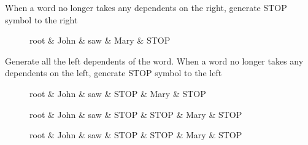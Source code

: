 \documentclass{beamer}
\begin{document}
\begin{frame}
When a word no longer takes any dependents on the right, generate STOP symbol to the right
\begin{figure}
\centering
\begin{dependency}[theme = simple]
\begin{deptext}
root \& John \& saw \& Mary \& STOP \\
\end{deptext}
\end{dependency}
\end{figure}
\end{frame}

\begin{frame}
Generate all the left dependents of the word. When a word no longer takes any dependents on the left, generate STOP symbol to the left

\begin{figure}
\centering
\begin{dependency}[theme = simple]
\begin{deptext}
root \& John \& saw \& STOP \& Mary \& STOP \\
\end{deptext}
\end{dependency}
\end{figure}
\end{frame}

\begin{frame}
\begin{figure}
\centering
\begin{dependency}[theme = simple]
\begin{deptext}
root \& John \& saw \& STOP \& STOP \& Mary \& STOP \\
\end{deptext}
\end{dependency}
\end{figure}
\end{frame}


\begin{frame}
\begin{figure}
\centering
\begin{dependency}[theme = simple]
\begin{deptext}
root \& John \& saw \& STOP \& STOP \& Mary \& STOP \\
\end{deptext}
\end{dependency}
\end{figure}
\end{frame}
\end{document}
